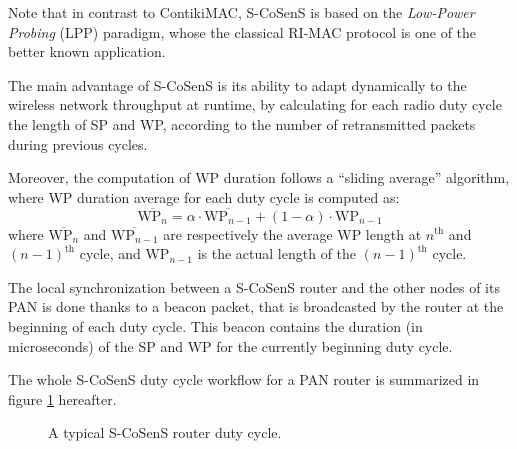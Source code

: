\documentclass[a4paper,twoside]{article}
\begin{document}
Note that in contrast to ContikiMAC, S-CoSenS is based on the \emph{Low-Power
Probing} (LPP) paradigm, whose the classical RI-MAC protocol \cite{RIMAC}
is one of the better known application.

The main advantage of S-CoSenS is its ability to adapt dynamically to the
wireless network throughput at runtime, by calculating for each radio duty
cycle the length of SP and WP, according to the number of retransmitted
packets during previous cycles.

Moreover, the computation of WP duration follows a ``sliding average''
algorithm, where WP duration average for each duty cycle is computed as:
\begin{displaymath}
\overline{\mathrm{WP}_{n}} = \alpha \cdot \overline{\mathrm{WP}_{n-1}}
                + (1 - \alpha) \cdot \mathrm{WP}_{n-1}
\end{displaymath}
where $\overline{\mathrm{WP}_{n}}$ and $\overline{\mathrm{WP}_{n-1}}$
are respectively the average WP length at $n^{\mathrm{th}}$ and
$(n-1)^{\mathrm{th}}$ cycle, and $\mathrm{WP}_{n-1}$ is the actual
length of the $(n-1)^{\mathrm{th}}$ cycle.

The local synchronization between a S-CoSenS router and the other nodes
of its PAN is done thanks to a beacon packet, that is broadcasted by
the router at the beginning of each duty cycle. This beacon contains the
duration (in microseconds) of the SP and WP for the currently beginning
duty cycle.

The whole S-CoSenS duty cycle workflow for a PAN router is summarized
in figure \ref{FigSCosensDutyCycle} hereafter.

\begin{figure}[!h]
\centering
{}
\caption{A typical S-CoSenS router duty cycle.}
\label{FigSCosensDutyCycle}
\end{figure}
\end{document}
